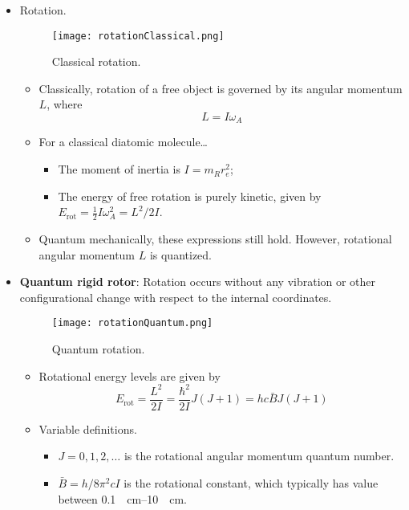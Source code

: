 \documentclass[../notes.tex]{subfiles}
\begin{document}
\begin{itemize}
    \item Rotation.
    \begin{figure}[H]
        \centering
        \texttt{[image: rotationClassical.png]}
        \caption{Classical rotation.}
        \label{fig:rotationClassical}
    \end{figure}
    \begin{itemize}
        \item Classically, rotation of a free object is governed by its angular momentum $L$, where
        \begin{equation*}
            L = I\omega_A
        \end{equation*}
        \item For a classical diatomic molecule\dots
        \begin{itemize}
            \item The moment of inertia is $I=m_Rr_e^2$;
            \item The energy of free rotation is purely kinetic, given by $E_\text{rot}=\frac{1}{2}I\omega_A^2=L^2/2I$.
        \end{itemize}
        \item Quantum mechanically, these expressions still hold. However, rotational angular momentum $L$ is quantized.
    \end{itemize}
    \item \textbf{Quantum rigid rotor}: Rotation occurs without any vibration or other configurational change with respect to the internal coordinates.
    \begin{figure}[h!]
        \centering
        \texttt{[image: rotationQuantum.png]}
        \caption{Quantum rotation.}
        \label{fig:rotationQuantum}
    \end{figure}
    \begin{itemize}
        \item Rotational energy levels are given by
        \begin{equation*}
            E_\text{rot} = \frac{L^2}{2I}
            = \frac{\hbar^2}{2I}J(J+1)
            = hc\bar{B}J(J+1)
        \end{equation*}
        \item Variable definitions.
        \begin{itemize}
            \item $J=0,1,2,\dots$ is the rotational angular momentum quantum number.
            \item $\bar{B}=h/8\pi^2 cI$ is the rotational constant, which typically has value between \SIrange{0.1}{10}{\per\centi\meter}.

\end{itemize}
\end{itemize}
\end{itemize}
\end{document}
